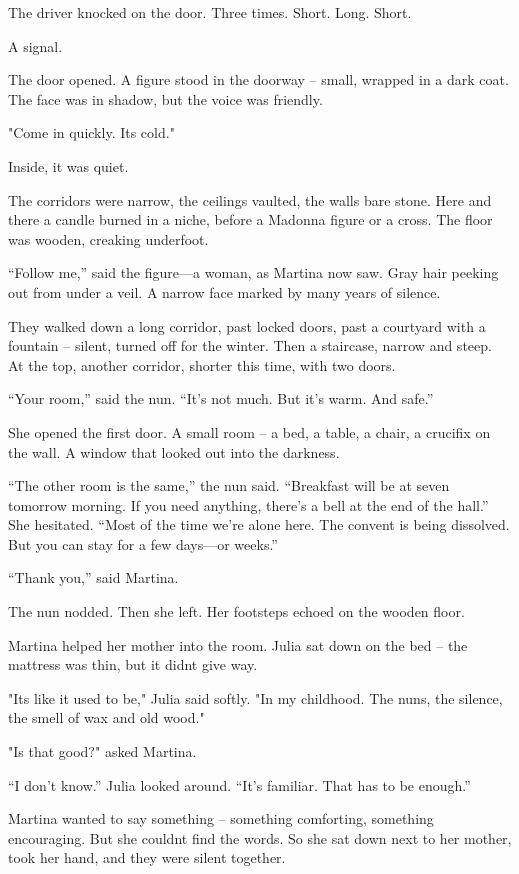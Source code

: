 \documentclass[
]{article}
\begin{document}
The driver knocked on the door. Three times. Short. Long. Short.

A signal.

The door opened. A figure stood in the doorway -- small, wrapped in a dark coat. The face was in shadow, but the voice was friendly.

"Come in quickly. It\textquotesingle s cold."

Inside, it was quiet.

The corridors were narrow, the ceilings vaulted, the walls bare stone. Here and there a candle burned in a niche, before a Madonna figure or a cross. The floor was wooden, creaking underfoot.

``Follow me,'' said the figure---a woman, as Martina now saw. Gray hair peeking out from under a veil. A narrow face marked by many years of silence.

They walked down a long corridor, past locked doors, past a courtyard with a fountain -- silent, turned off for the winter. Then a staircase, narrow and steep. At the top, another corridor, shorter this time, with two doors.

``Your room,'' said the nun. ``It's not much. But it's warm. And safe.''

She opened the first door. A small room -- a bed, a table, a chair, a crucifix on the wall. A window that looked out into the darkness.

``The other room is the same,'' the nun said. ``Breakfast will be at seven tomorrow morning. If you need anything, there's a bell at the end of the hall.'' She hesitated. ``Most of the time we're alone here. The convent is being dissolved. But you can stay for a few days---or weeks.''

``Thank you,'' said Martina.

The nun nodded. Then she left. Her footsteps echoed on the wooden floor.

Martina helped her mother into the room. Julia sat down on the bed -- the mattress was thin, but it didn\textquotesingle t give way.

"It\textquotesingle s like it used to be," Julia said softly. "In my childhood. The nuns, the silence, the smell of wax and old wood."

"Is that good?" asked Martina.

``I don't know.'' Julia looked around. ``It's familiar. That has to be enough.''

Martina wanted to say something -- something comforting, something encouraging. But she couldn\textquotesingle t find the words. So she sat down next to her mother, took her hand, and they were silent together.
\end{document}
